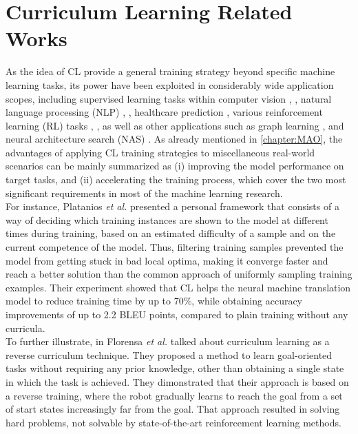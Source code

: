 \section{Curriculum Learning Related Works}
As the idea of CL provide a general training strategy beyond specific machine learning
tasks, its power have been exploited in considerably wide application scopes, including supervised learning
tasks within computer vision \cite{guo2018curriculumnet}, \cite{jiang2014easy}, natural language processing (NLP) \cite{platanios2019competence}, \cite{tay2019simple}, healthcare prediction \cite{el2020student}, various
reinforcement learning (RL) tasks \cite{florensa2017reverse}, \cite{narvekar2017autonomous}, \cite{ren2018self} as well as other applications such
as graph learning \cite{gong2019multi}, \cite{qu2018curriculum} and neural architecture search (NAS) \cite{guo2018curriculumnet}. As already mentioned in \ref{chapter:MAO}, the advantages of applying CL
training strategies to miscellaneous real-world scenarios can be mainly summarized as (i) improving the model performance on 
target tasks, and (ii) accelerating the training process, which cover the two most significant 
requirements in most of the machine learning research. \\
For instance,
Platanios \textit{et al.} \cite{platanios2019competence} presented 
a personal framework that consists of a way of deciding which training instances
are shown to the model at different times during training, based on 
an estimated difficulty of a sample and on the current competence
of the model. Thus, filtering training samples prevented the model from 
getting stuck in bad local optima, making it converge faster and reach
a better solution than the common approach of uniformly 
sampling training examples. Their experiment showed that CL helps the 
neural machine translation model to reduce training time by up to 70\%, while obtaining accuracy improvements of up to 2.2 BLEU points, compared
to plain training without any curricula. \\ To further illustrate, in \cite{florensa2017reverse} Florensa 
\textit{et al.} talked about curriculum learning as a reverse curriculum technique. 
They proposed a method to learn goal-oriented tasks without requiring
any prior knowledge, other than obtaining a single state in which
the task is achieved. They dimonstrated that their approach is 
based on a reverse training, where the robot gradually learns to reach 
the goal from a set of start states increasingly far from the goal.
That approach resulted in solving hard problems, not solvable 
by state-of-the-art reinforcement learning methods.

